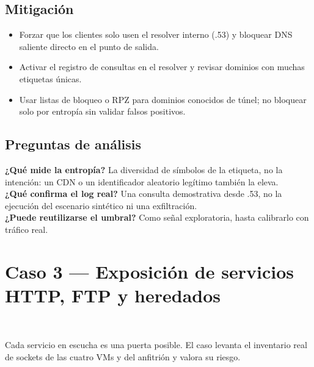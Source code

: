 \subsection{Mitigación}
\begin{itemize}
\item Forzar que los clientes solo usen el resolver interno (.53) y bloquear DNS saliente directo en el punto de salida.
\item Activar el registro de consultas en el resolver y revisar dominios con muchas etiquetas únicas.
\item Usar listas de bloqueo o RPZ para dominios conocidos de túnel; no bloquear solo por entropía sin validar falsos positivos.
\end{itemize}

\subsection{Preguntas de análisis}
\textbf{¿Qué mide la entropía?} La diversidad de símbolos de la etiqueta, no la intención: un CDN o un identificador aleatorio legítimo también la eleva.\\
\textbf{¿Qué confirma el log real?} Una consulta demostrativa desde .53, no la ejecución del escenario sintético ni una exfiltración.\\
\textbf{¿Puede reutilizarse el umbral?} Como señal exploratoria, hasta calibrarlo con tráfico real.

\section{Caso 3 — Exposición de servicios HTTP, FTP y heredados}
\REAL\ \ANA

Cada servicio en escucha es una puerta posible. El caso levanta el inventario real de sockets de las cuatro VMs y del anfitrión y valora su riesgo.

